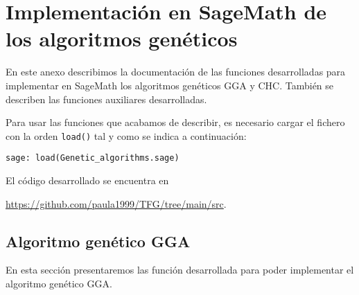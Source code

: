 \chapter[Implementación en SageMath de los algoritmos genéticos]{Implementación en SageMath de los algoritmos genéticos}
\label{annex:sage-geneticos}

En este anexo describimos la documentación de las funciones desarrolladas para implementar en SageMath los algoritmos genéticos GGA y CHC. También se describen las funciones auxiliares desarrolladas. 

Para usar las funciones que acabamos de describir, es necesario cargar el fichero con la orden \texttt{load()} tal y como se indica a continuación:

\begin{lstlisting}[gobble=4]
    sage: load(Genetic_algorithms.sage)
\end{lstlisting}

El código desarrollado se encuentra en
\begin{center}
\url{https://github.com/paula1999/TFG/tree/main/src}.
\end{center}

\section{Algoritmo genético GGA}

En esta sección presentaremos las función desarrollada para poder implementar el algoritmo genético GGA.

